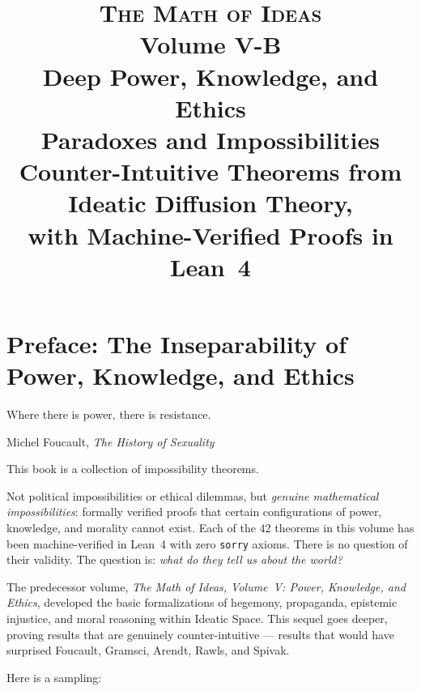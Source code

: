 \documentclass[11pt,openany]{book}
\title{%
  \vspace{-2cm}
  {\LARGE\scshape The Math of Ideas}\\[0.3cm]
  {\Large Volume V-B}\\[0.5cm]
  {\huge\bfseries Deep Power, Knowledge, and Ethics}\\[0.3cm]
  {\Large Paradoxes and Impossibilities}\\[1cm]
  {\large Counter-Intuitive Theorems from Ideatic Diffusion Theory,\\
  with Machine-Verified Proofs in Lean~4}
}
\author{}
\date{}
\theoremstyle{definition}
\theoremstyle{plain}
\theoremstyle{remark}
\begin{document}
\maketitle

\tableofcontents

\chapter*{Preface: The Inseparability of Power, Knowledge, and Ethics}

\epigraph{Where there is power, there is resistance.}{Michel Foucault, \textit{The History of Sexuality}}

This book is a collection of impossibility theorems.

Not political impossibilities or ethical dilemmas, but \emph{genuine mathematical impossibilities}: formally verified proofs that certain configurations of power, knowledge, and morality cannot exist.  Each of the 42 theorems in this volume has been machine-verified in Lean~4 with zero \texttt{sorry} axioms.  There is no question of their validity.  The question is: \emph{what do they tell us about the world?}

The predecessor volume, \emph{The Math of Ideas, Volume~V: Power, Knowledge, and Ethics}, developed the basic formalizations of hegemony, propaganda, epistemic injustice, and moral reasoning within Ideatic Space.  This sequel goes deeper, proving results that are genuinely counter-intuitive --- results that would have surprised Foucault, Gramsci, Arendt, Rawls, and Spivak.

Here is a sampling:
\end{document}
